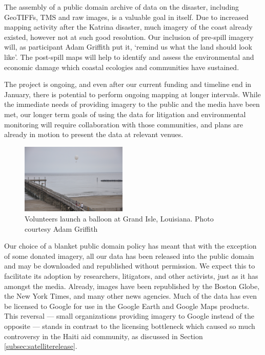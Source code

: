\documentclass[11pt,oneside,notitlepage]{report}
\begin{document}
{{The assembly of a public domain archive of data on the disaster, including \ac{GeoTIFF}s, \ac{TMS} and raw images, is a valuable goal in itself. Due to increased mapping activity after the Katrina disaster, much imagery of the coast already existed, however not at such good resolution. Our inclusion of pre-spill imagery will, as participant Adam Griffith put it, `remind us what the land should look like'. \cite{griffith2010isle} The post-spill maps will help to identify and assess the environmental and economic damage which coastal ecologies and communities have sustained.  
 
The project is ongoing, and even after our current funding and timeline end in January, there is potential to perform ongoing mapping at longer intervals. While the immediate needs of providing imagery to the public and the media have been met, our longer term goals of using the data for litigation and environmental monitoring will require collaboration with those communities, and plans are already in motion to present the data at relevant venues. 

\begin{figure}
	\begin{flushright}
		\includegraphics[width=0.45\textwidth]{images/labb-adam-balloon.jpg}
		\caption{Volunteers launch a balloon at Grand Isle, Louisiana. Photo courtesy Adam Griffith}
	\end{flushright}
\end{figure}

Our choice of a blanket public domain policy has meant that with the exception of some donated imagery, all our data has been released into the public domain and may be downloaded and republished without permission. We expect this to facilitate its adoption by researchers, litigators, and other activists, just as it has amongst the media. Already, images have been republished by the Boston Globe, the New York Times, and many other news agencies. Much of the data has even be licensed to Google for use in the Google Earth and Google Maps products. This reversal --- small organizations providing imagery to Google instead of the opposite --- stands in contrast to the licensing bottleneck which caused so much controversy in the Haiti aid community, as discussed in Section \ref{subsec:satelliterelease}. 

}}
\end{document}
